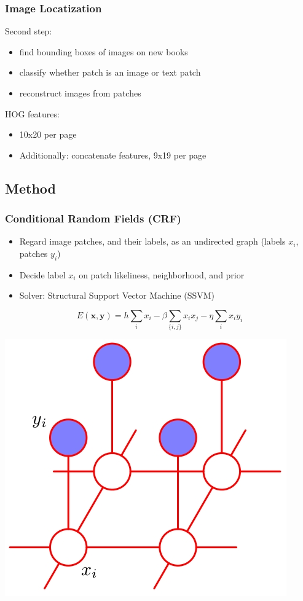 
\begin{frame}
\frametitle{Image Locatization}
Second step:
\begin{itemize}
\item find bounding boxes of images on new books
\item classify whether patch is an image or text patch
\item reconstruct images from patches
\end{itemize}
HOG features:
\begin{itemize}
\item 10x20 per page
\item Additionally: concatenate features, 9x19 per page
\end{itemize}
\end{frame}

\subsection{Method}
\begin{frame}
\frametitle{Conditional Random Fields (CRF)}
\begin{itemize}
\item Regard image patches, and their labels, as an undirected graph (labels $x_i$, patches $y_i$)
\item Decide label $x_i$ on patch likeliness, neighborhood, and prior
\item Solver: Structural Support Vector Machine (SSVM)
\end{itemize}
$$ E(\mathbf{x}, \mathbf{y}) = h\sum_i x_i - \beta \sum_{\{i, j\}} x_i x_j
- \eta \sum_i x_i y_i $$

\includegraphics[width=.3\paperwidth]{resources/crf}
\end{frame}

